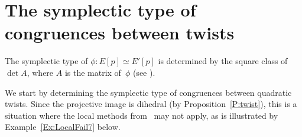 \documentclass[12pt, reqno]{amsart}
\newcommand{\Q}{\mathbb{Q}}
\newcommand{\Qbar}{{\overline{\Q}}}
\def\r3{\sqrt{-3}}
\numberwithin{equation}{section}
\newtheorem{corollary}[theorem]{Corollary}
\theoremstyle{definition}
\theoremstyle{remark}
\newtheorem{remark}[theorem]{Remark}
\begin{document}
\begin{comment}
\begin{corollary}
For every $b\in\Q^*$ the curves $E_{-27b}$ and $E_{27\cdot28/b}$ have
mod~$7$ Galois representations which are antisymplectically isomorphic
to that of~$E_b$.

If $E_b[7]$ and $E_{b'}[7]$ are isomorphic then $b'\in\{b,-28/b, -27b,
27\cdot28/b\}$ (modulo sixth powers) and these values are distinct.
Hence for each elliptic curve $E/\Q$ with $j(E)=0$, there are
precisely three curves $E'/\Q$ with $j(E')=0$, excluding $E$ itself,
with isomorphic $7$-torsion.
\end{corollary}
\begin{proof}
Although one can show that $E_b$ and $E_{-27b}$ are antisymplectically
isomorphic using the same methods as used for Theorem~\ref{T:j=0}, it
is easier to note that the curves $E_b$ and~$E_{-27b}$ are
$3$-isogenous; since $3$ is a non-quadratic residue of~$7$, a
$3$-isogeny between them induces an anti-symplectic isomorphism
between their $7$-torsion modules. Alternatively, these curves are
quadratic twists by~$-3$, and the conclusion also follows from
Theorem~\ref{T:Cartan}.

The last part follows from the proof of Theorem~\ref{T:j=0}.
\end{proof}

\end{comment}


\section{The symplectic type of congruences between twists} \label{S:type}



The symplectic type of $\phi : E[p] \simeq E'[p]$ is determined by the
square class of $\det A$, where $A$ is the matrix of~$\phi$ (see
\cite[Lemma~6]{FKSym}).

We start by determining the symplectic type of congruences between quadratic twists.
Since the projective
image is dihedral (by Proposition~\ref{P:twist}), this
is a situation where the local methods from~\cite{FKSym} may not
apply, as is illustrated by Example~\ref{Ex:LocalFail7} below.
\end{document}
